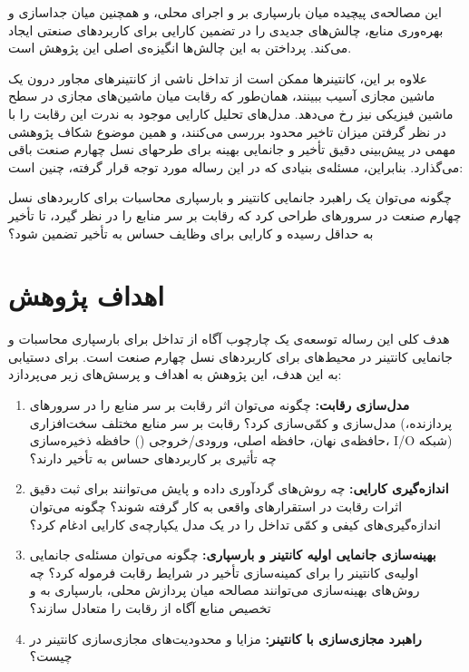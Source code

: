 این مصالحه‌ی پیچیده میان بارسپاری بر  و اجرای محلی، و همچنین میان جدا‌سازی و بهره‌وری منابع، چالش‌های جدیدی را در تضمین کارایی برای کاربردهای صنعتی ایجاد می‌کند. پرداختن به این چالش‌ها انگیزه‌ی اصلی این پژوهش است.

علاوه بر این، کانتینرها ممکن است از تداخل ناشی از کانتینرهای مجاور درون یک ماشین مجازی آسیب ببینند، همان‌طور که رقابت میان ماشین‌های مجازی در سطح ماشین فیزیکی نیز رخ می‌دهد. مدل‌های تحلیل کارایی موجود به ندرت این رقابت را با در نظر گرفتن میزان تاخیر محدود بررسی می‌کنند، و همین موضوع شکاف پژوهشی مهمی در پیش‌بینی دقیق تأخیر و جانمایی بهینه برای طرحهای نسل چهارم صنعت باقی می‌گذارد. بنابراین، مسئله‌ی بنیادی که در این رساله مورد توجه قرار گرفته، چنین است:

چگونه می‌توان یک راهبرد جانمایی کانتینر و بارسپاری محاسبات برای کاربردهای نسل چهارم صنعت در سرورهای  طراحی کرد که رقابت بر سر منابع را در نظر گیرد، تا تأخیر به حداقل رسیده و کارایی برای وظایف حساس به تأخیر تضمین شود؟

\section{اهداف پژوهش}

هدف کلی این رساله توسعه‌ی یک چارچوب آگاه از تداخل برای بارسپاری محاسبات و جانمایی کانتینر در محیط‌های  برای کاربردهای نسل چهارم صنعت است. برای دستیابی به این هدف، این پژوهش به اهداف و پرسش‌های زیر می‌پردازد:

\begin{enumerate}
\item
\textbf{مدل‌سازی رقابت:}
چگونه می‌توان اثر رقابت بر سر منابع را در سرورهای  مدل‌سازی و کمّی‌سازی کرد؟
رقابت بر سر منابع مختلف سخت‌افزاری (پردازنده، حافظه‌ی نهان، حافظه اصلی، ورودی/خروجی () حافظه ذخیره‌سازی، I/O شبکه) چه تأثیری بر کاربردهای حساس به تأخیر دارند؟

\item
\textbf{اندازه‌گیری کارایی:}
چه روش‌های گردآوری داده و پایش می‌توانند برای ثبت دقیق اثرات رقابت در استقرارهای واقعی  به کار گرفته شوند؟
چگونه می‌توان اندازه‌گیری‌های کیفی و کمّی تداخل را در یک مدل یکپارچه‌ی کارایی ادغام کرد؟

\item
\textbf{بهینه‌سازی جانمایی اولیه کانتینر و بارسپاری:}
چگونه می‌توان مسئله‌ی جانمایی اولیه‌ی کانتینر را برای کمینه‌سازی تأخیر در شرایط رقابت فرموله کرد؟
چه روش‌های بهینه‌سازی می‌توانند مصالحه میان پردازش محلی، بارسپاری به  و تخصیص منابع آگاه از رقابت را متعادل سازند؟

\item
\textbf{راهبرد مجازی‌سازی با کانتینر:}
مزایا و محدودیت‌های مجازی‌سازی کانتینر در  چیست؟

\end{enumerate}

